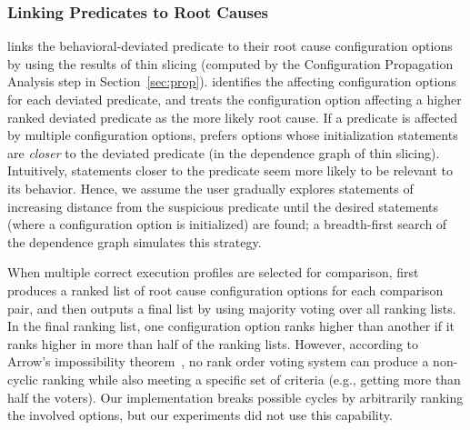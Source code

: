 \subsubsection{Linking Predicates to Root Causes}
\label{sec:linking}


\ourtool links the behavioral-deviated
predicate to their root cause configuration options
by using the results of thin slicing (computed by the Configuration Propagation
Analysis step in Section~\ref{sec:prop}).
\ourtool identifies 
the affecting configuration options for each deviated predicate,
and treats the configuration option
affecting a higher ranked deviated predicate as the more likely
root cause. If a predicate is affected by multiple
configuration options, \ourtool prefers options whose initialization
statements are \textit{closer} to the
deviated predicate (in the dependence graph of thin slicing).
Intuitively, statements closer to the
predicate seem more likely to be relevant to its behavior.
Hence, we assume the user gradually explores statements of
increasing distance 
from the suspicious predicate until the desired statements (where a configuration
option is initialized) are found; a breadth-first
search of the dependence graph simulates this strategy.


When multiple correct execution profiles are selected for comparison,
\ourtool first produces a ranked list of root cause
configuration options for each comparison pair, and then outputs
a final list by using majority voting over all ranking lists.
In the final ranking list, one configuration option ranks higher
than another if it ranks higher in more than half of the ranking lists.
However, according to Arrow's impossibility theorem~\cite{Fishburn1970103},
no rank order voting system can produce a non-cyclic ranking while also
meeting a specific set of criteria (e.g., getting more than half the voters).
Our implementation breaks possible cycles by arbitrarily ranking the
involved options, but our experiments did not use this capability.



